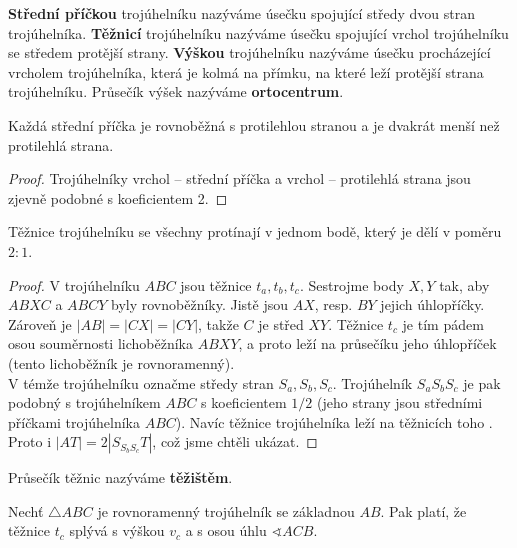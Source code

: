\begin{definition}
  \textbf{Střední příčkou} trojúhelníku nazýváme úsečku spojující středy dvou stran trojúhelníka.
  \textbf{Těžnicí} trojúhelníku nazýváme úsečku spojující vrchol trojúhelníku se středem protější strany.
  \textbf{Výškou} trojúhelníku nazýváme úsečku procházející vrcholem trojúhelníka, která je kolmá na přímku, na které leží protější strana trojúhelníku. Průsečík výšek nazýváme \textbf{ortocentrum}.
\end{definition}

\begin{veta}
  Každá střední příčka je rovnoběžná s protilehlou stranou a je dvakrát menší než protilehlá strana.
\end{veta}

\begin{proof}
  Trojúhelníky vrchol -- střední příčka a vrchol -- protilehlá strana jsou zjevně podobné s koeficientem 2.
\end{proof}

\begin{veta}
  Těžnice trojúhelníku se všechny protínají v jednom bodě, který je dělí v poměru $2:1$.
\end{veta}

\begin{proof}
    V trojúhelníku $ABC$ jsou těžnice $t_a,t_b,t_c$. Sestrojme body $X,Y$ tak, aby
    $ABXC$ a $ABCY$ byly rovnoběžníky. Jistě jsou $AX$, resp. $BY$ jejich úhlopříčky.
    Zároveň je $|AB|=|CX|=|CY|$, takže $C$ je střed $XY$. Těžnice $t_c$ je tím pádem
    osou souměrnosti lichoběžníka $ABXY$, a proto leží na průsečíku jeho úhlopříček
    (tento lichoběžník je rovnoramenný).\\
    V témže trojúhelníku označme středy stran $S_a,S_b,S_c$. Trojúhelník $S_aS_bS_c$ je
    pak podobný s trojúhelníkem $ABC$ s koeficientem $1/2$ (jeho strany jsou středními
    příčkami trojúhelníka $ABC$). Navíc těžnice  trojúhelníka leží na
    těžnicích toho . Proto i $|AT|=2|S_{S_bS_c}T|$, což jsme chtěli ukázat.
\end{proof}

\begin{definition}
Průsečík těžnic nazýváme \textbf{těžištěm}.
\end{definition}

\begin{veta}
  Nechť $\triangle ABC$ je rovnoramenný trojúhelník se základnou $AB$. Pak platí, že těžnice $t_c$ splývá s výškou $v_c$ a s osou úhlu $\sphericalangle ACB$.
\end{veta}

